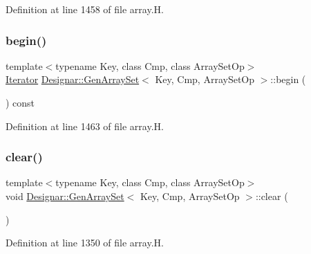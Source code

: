 Definition at line 1458 of file array.\+H.

\mbox{\label{class_designar_1_1_gen_array_set_a9bccd51f6d73a05400361cf5deff8aac}} 
\subsubsection{\texorpdfstring{begin()}{begin()}\hspace{0.1cm}{\footnotesize\ttfamily [2/2]}}
{\footnotesize\ttfamily template$<$typename Key, class Cmp, class Array\+Set\+Op$>$ \\
\hyperlink{class_designar_1_1_gen_array_set_1_1_iterator}{Iterator} \hyperlink{class_designar_1_1_gen_array_set}{Designar\+::\+Gen\+Array\+Set}$<$ Key, Cmp, Array\+Set\+Op $>$\+::begin (\begin{DoxyParamCaption}{ }\end{DoxyParamCaption}) const\hspace{0.3cm}{\ttfamily [inline]}}



Definition at line 1463 of file array.\+H.

\mbox{\label{class_designar_1_1_gen_array_set_aa1b1d249debb38432e56b2e585d822af}} 
\subsubsection{\texorpdfstring{clear()}{clear()}}
{\footnotesize\ttfamily template$<$typename Key, class Cmp, class Array\+Set\+Op$>$ \\
void \hyperlink{class_designar_1_1_gen_array_set}{Designar\+::\+Gen\+Array\+Set}$<$ Key, Cmp, Array\+Set\+Op $>$\+::clear (\begin{DoxyParamCaption}{ }\end{DoxyParamCaption})\hspace{0.3cm}{\ttfamily [inline]}}



Definition at line 1350 of file array.\+H.

\mbox{\label{class_designar_1_1_gen_array_set_a23644b099a1bf858784e474d833245a8}} 
